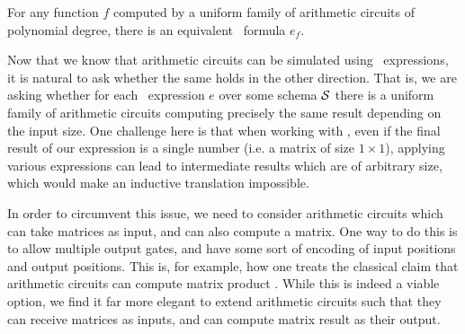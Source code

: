 
\begin{corollary}
\label{cor-circ-ml}
For any function $f$ computed by a uniform family of arithmetic circuits of polynomial degree, there is an equivalent \langfor\ formula $e_f$.
\end{corollary}



Now that we know that arithmetic circuits can be simulated using \langfor\ expressions, it is natural to ask whether the same holds in the other direction. That is, we are asking whether for each \langfor\ expression $e$ over some schema $\mathcal{S}$ there is a uniform family of arithmetic circuits computing precisely the same result depending on the input size. One challenge here is that when working with \langfor, even if the final result of our expression is a single number (i.e. a matrix of size $1\times 1$), applying various expressions can lead to intermediate results which are of arbitrary size, which would make an inductive translation impossible. 

In order to circumvent this issue, we need to consider arithmetic circuits which can take matrices as input, and can also compute a matrix. One way to do this is to allow multiple output gates, and have some sort of encoding of input positions and output positions. This is, for example, how one treats the classical claim that arithmetic circuits can compute matrix product \cite{?}. While this is indeed a viable option, we find it far more elegant to extend arithmetic circuits such that they can receive matrices as inputs, and can compute matrix result as their output.

